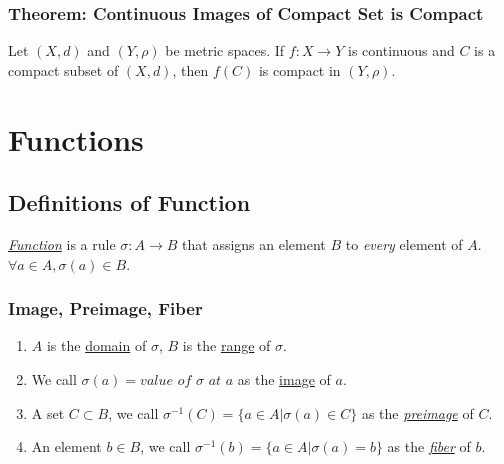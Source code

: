 \documentclass[11pt]{elegantbook}
\begin{document}
\subsection{Theorem: Continuous Images of Compact Set is Compact}
\begin{theorem}\label{con_compact_is_compact}
    Let $(X, d)$ and $(Y, \rho)$ be metric spaces. If $f : X \rightarrow Y$ is continuous and $C$ is a compact subset of $(X, d)$, then $f(C)$ is compact in $(Y, \rho)$.
\end{theorem}



\chapter{Functions}
\section{Definitions of Function}
\begin{definition}[Function]
    \normalfont
    \underline{\textit{Function}} is a rule $\sigma:A\rightarrow B$ that assigns an element $B$ to \textit{every} element of $A$. $\forall a\in A, \sigma(a)\in B$.
\end{definition}
\subsection{Image, Preimage, Fiber}
\begin{definition}
    \normalfont
\begin{enumerate}
    \item $A$ is the \underline{domain} of $\sigma$, $B$ is the \underline{range} of $\sigma$.
    \item We call $\sigma (a)= \textit{value of } \sigma\textit{ at } a$ as the \underline{image} of $a$.
    \item A set $C\subset B$, we call $\sigma^{-1}(C)=\{a\in A| \sigma(a)\in C\}$ as the \textit{\underline{preimage}} of $C$.
    \item An element $b\in B$, we call $\sigma^{-1}(b)=\{a\in A| \sigma(a)=b \}$ as the \textit{\underline{fiber}} of $b$.
\end{enumerate}
\end{definition}
\end{document}

